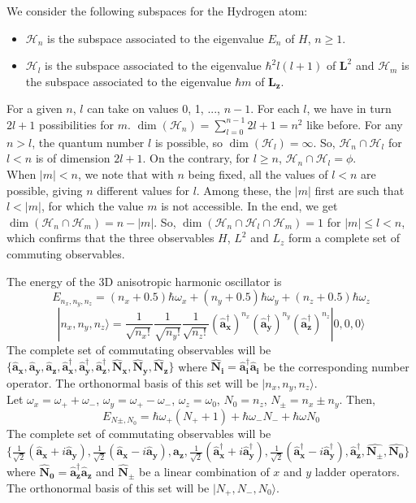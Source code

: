 \documentclass[a4paper]{article}
\begin{document}
\begin{eg}
We consider the following subspaces for the Hydrogen atom:
\begin{itemize}
    \item $\mathcal{H}_n$ is the subspace associated to the eigenvalue $E_n$ of $H$, $n\geq 1$.
    \item $\mathcal{H}_l$ is the subspace associated to the eigenvalue $\hbar^2l(l+1)$ of $\mathbf{L}^2$ and $\mathcal{H}_m$ is the subspace associated to the eigenvalue $\hbar m$ of $\mathbf{L_z}$.
\end{itemize}
For a given $n$, $l$ can take on values 0, 1, ..., $n-1$. For each $l$, we have in turn $2l+1$ possibilities for $m$. $\dim(\mathcal{H}_n)=\sum_{l=0}^{n-1}2l+1=n^2$ like before. For any $n>l$, the quantum number $l$ is possible, so $\dim(\mathcal{H}_l)=\infty$. So, $\mathcal{H}_n\cap\mathcal{H}_l$ for $l<n$ is of dimension $2l+1$. On the contrary, for $l\geq n$, $\mathcal{H}_n\cap\mathcal{H}_l=\phi$.\\[5pt]
When $|m|<n$, we note that with $n$ being fixed, all the values of $l<n$ are possible, giving $n$ different values for $l$. Among these, the $|m|$ first are such that $l<|m|$, for which the value $m$ is not accessible. In the end, we get $\dim(\mathcal{H}_n\cap\mathcal{H}_m)=n-|m|$. So, $\dim(\mathcal{H}_n\cap\mathcal{H}_l\cap\mathcal{H}_m)=1$ for $|m|\leq l<n$, which confirms that the three observables $H$, $L^2$ and $L_z$ form a complete set of commuting observables.
\end{eg}
\begin{eg}
The energy of the 3D anisotropic harmonic oscillator is
$$E_{n_x,n_y,n_z}=(n_x+0.5)\hbar\omega_x+(n_y+0.5)\hbar\omega_y+(n_z+0.5)\hbar\omega_z$$
$$|n_x,n_y,n_z\rangle=\frac{1}{\sqrt{n_x!}}\frac{1}{\sqrt{n_y!}}\frac{1}{\sqrt{n_z!}}(\mathbf{\hat{a}_x^\dag})^{n_x}(\mathbf{\hat{a}_y^\dag})^{n_y}(\mathbf{\hat{a}_z^\dag})^{n_z}|0,0,0\rangle$$
The complete set of commutating observables will be $\{\mathbf{\hat{a}_x},\mathbf{\hat{a}_y},\mathbf{\hat{a}_z},\mathbf{\hat{a}_x^\dag},\mathbf{\hat{a}_y^\dag},\mathbf{\hat{a}_z^\dag},\mathbf{\hat{N}_x},\mathbf{\hat{N}_y},\mathbf{\hat{N}_z}\}$ where $\mathbf{\hat{N}_i}=\mathbf{\hat{a}_i^\dag}\mathbf{\hat{a}_i}$ be the corresponding number operator. The orthonormal basis of this set will be $|n_x,n_y,n_z\rangle$.\\[5pt]
Let $\omega_x=\omega_++\omega_-$, $\omega_y=\omega_+-\omega_-$, $\omega_z=\omega_0$, $N_0=n_z$, $N_\pm=n_x\pm n_y$. Then,
$$E_{N\pm,N_0}=\hbar\omega_+(N_++1)+\hbar\omega_-N_-+\hbar\omega N_0$$
The complete set of commutating observables will be $\{\frac{1}{\sqrt{2}}(\mathbf{\hat{a}_x}+i\mathbf{\hat{a}_y}),\frac{1}{\sqrt{2}}(\mathbf{\hat{a}_x}-i\mathbf{\hat{a}_y}),\mathbf{\hat{a}_z},\frac{1}{\sqrt{2}}(\mathbf{\hat{a}_x^\dag}+i\mathbf{\hat{a}_y^\dag}),\frac{1}{\sqrt{2}}(\mathbf{\hat{a}_x^\dag}-i\mathbf{\hat{a}_y^\dag}),\mathbf{\hat{a}_z^\dag}, \mathbf{\hat{N_{\pm}}},\mathbf{\hat{N_0}}\}$ where $\mathbf{\hat{N}_0}=\mathbf{\hat{a}_z^\dag}\mathbf{\hat{a}_z}$ and $\mathbf{\hat{N}_\pm}$ be a linear combination of $x$ and $y$ ladder operators. The orthonormal basis of this set will be $|N_+,N_-,N_0\rangle$.
\end{eg}
\end{document}
